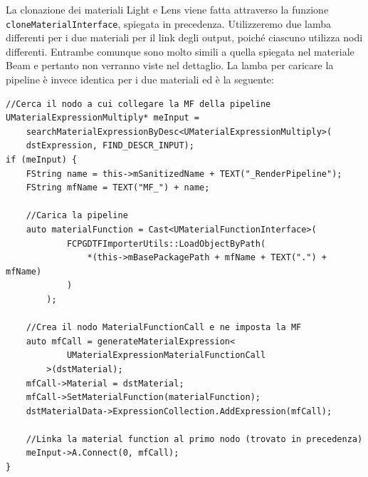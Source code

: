 \documentclass[main.tex]{subfiles}
\begin{document}
La clonazione dei materiali Light e Lens viene fatta attraverso la funzione \lstinline{cloneMaterialInterface}, spiegata in precedenza. Utilizzeremo due lamba differenti per i due materiali per il link degli output, poiché ciascuno utilizza nodi differenti. Entrambe comunque sono molto simili a quella spiegata nel materiale Beam e pertanto non verranno viste nel dettaglio. La lamba per caricare la pipeline è invece identica per i due materiali ed è la seguente:
\begin{lstlisting}
//Cerca il nodo a cui collegare la MF della pipeline
UMaterialExpressionMultiply* meInput =
    searchMaterialExpressionByDesc<UMaterialExpressionMultiply>(
    dstExpression, FIND_DESCR_INPUT);
if (meInput) {
    FString name = this->mSanitizedName + TEXT("_RenderPipeline");
    FString mfName = TEXT("MF_") + name;

    //Carica la pipeline
    auto materialFunction = Cast<UMaterialFunctionInterface>(
            FCPGDTFImporterUtils::LoadObjectByPath(
                *(this->mBasePackagePath + mfName + TEXT(".") + mfName)
            )
        );

    //Crea il nodo MaterialFunctionCall e ne imposta la MF
    auto mfCall = generateMaterialExpression<
            UMaterialExpressionMaterialFunctionCall
        >(dstMaterial);
    mfCall->Material = dstMaterial;
    mfCall->SetMaterialFunction(materialFunction);
    dstMaterialData->ExpressionCollection.AddExpression(mfCall);

    //Linka la material function al primo nodo (trovato in precedenza)
    meInput->A.Connect(0, mfCall);
}
\end{lstlisting}
\end{document}
